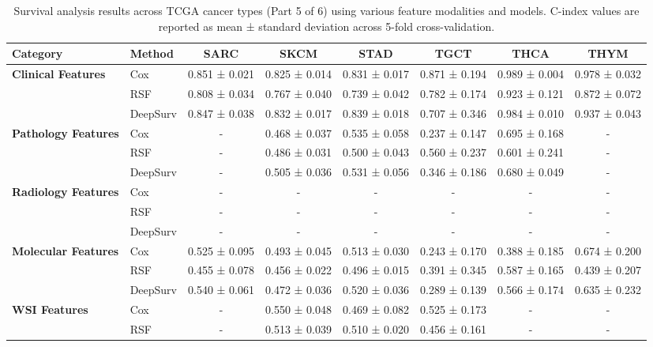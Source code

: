 \begin{sidewaystable}[htbp]
    \centering
    \caption{Survival analysis results across TCGA cancer types (Part 5 of 6) using various feature modalities and models. C-index values are reported as mean ± standard deviation across 5-fold cross-validation.}
    \label{tab:survival_results_5}
    \begin{tabular}{@{}llcccccc@{}}
        \toprule
        \textbf{Category} & \textbf{Method} & \textbf{SARC} & \textbf{SKCM} & \textbf{STAD} & \textbf{TGCT} & \textbf{THCA} & \textbf{THYM} \\
        \midrule
        \multirow{3}{*}{\textbf{Clinical Features}} & Cox & 0.851 ± 0.021 & 0.825 ± 0.014 & 0.831 ± 0.017 & 0.871 ± 0.194 & 0.989 ± 0.004 & 0.978 ± 0.032 \\
        & RSF & 0.808 ± 0.034 & 0.767 ± 0.040 & 0.739 ± 0.042 & 0.782 ± 0.174 & 0.923 ± 0.121 & 0.872 ± 0.072 \\
        & DeepSurv & 0.847 ± 0.038 & 0.832 ± 0.017 & 0.839 ± 0.018 & 0.707 ± 0.346 & 0.984 ± 0.010 & 0.937 ± 0.043 \\
        \midrule
        \multirow{3}{*}{\textbf{Pathology Features}} & Cox & - & 0.468 ± 0.037 & 0.535 ± 0.058 & 0.237 ± 0.147 & 0.695 ± 0.168 & - \\
        & RSF & - & 0.486 ± 0.031 & 0.500 ± 0.043 & 0.560 ± 0.237 & 0.601 ± 0.241 & - \\
        & DeepSurv & - & 0.505 ± 0.036 & 0.531 ± 0.056 & 0.346 ± 0.186 & 0.680 ± 0.049 & - \\
        \midrule
        \multirow{3}{*}{\textbf{Radiology Features}} & Cox & - & - & - & - & - & - \\
        & RSF & - & - & - & - & - & - \\
        & DeepSurv & - & - & - & - & - & - \\
        \midrule
        \multirow{3}{*}{\textbf{Molecular Features}} & Cox & 0.525 ± 0.095 & 0.493 ± 0.045 & 0.513 ± 0.030 & 0.243 ± 0.170 & 0.388 ± 0.185 & 0.674 ± 0.200 \\
        & RSF & 0.455 ± 0.078 & 0.456 ± 0.022 & 0.496 ± 0.015 & 0.391 ± 0.345 & 0.587 ± 0.165 & 0.439 ± 0.207 \\
        & DeepSurv & 0.540 ± 0.061 & 0.472 ± 0.036 & 0.520 ± 0.036 & 0.289 ± 0.139 & 0.566 ± 0.174 & 0.635 ± 0.232 \\
        \midrule
        \multirow{3}{*}{\textbf{WSI Features}} & Cox & - & 0.550 ± 0.048 & 0.469 ± 0.082 & 0.525 ± 0.173 & - & - \\
        & RSF & - & 0.513 ± 0.039 & 0.510 ± 0.020 & 0.456 ± 0.161 & - & - \\

\end{tabular}
\end{sidewaystable}
